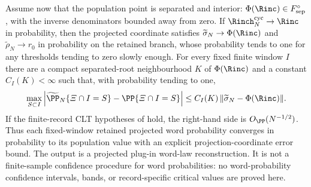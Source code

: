 \begin{proposition}
Assume now that the population point is separated and interior:
\(\Phi(\Rinc)\in F_{\rm sep}^{\circ}\), with the inverse denominators bounded
away from zero.  If
\(\Rinch_N^{\mathrm{cyc}}\to \Rinc\) in probability, then the projected
coordinate satisfies \(\widetilde\sigma_N\to\Phi(\Rinc)\) and
\(\widetilde\rho_N\to r_0\) in probability on the retained branch, whose
probability tends to one for any thresholds tending to zero slowly enough.
For every fixed finite window \(I\) there are a compact separated-root
neighbourhood \(K\) of \(\Phi(\Rinc)\) and a constant \(C_I(K)<\infty\) such that,
with probability tending to one,
\begin{equation}\label{eq:complete-law-reporting-fixed-window-bound-main}
\max_{S\subset I}
\left|\widetilde\PP_N\{\varXi\cap I=S\}
      -\PP\{\varXi\cap I=S\}\right|
\le C_I(K)\,\|\widetilde\sigma_N-\Phi(\Rinc)\|.
\end{equation}
If the finite-record CLT hypotheses of
 hold, the right-hand side is
\(O_{\PP}(N^{-1/2})\).  Thus each fixed-window retained projected word
probability converges in probability to its population value with an explicit
projection-coordinate error bound.  The output is a projected plug-in word-law
reconstruction.  It is not a finite-sample confidence procedure for word
probabilities: no word-probability confidence intervals, bands, or
record-specific critical values are proved here.
\end{proposition}

